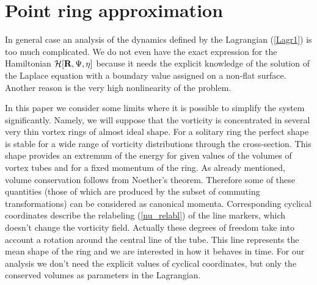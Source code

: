 \section{Point ring approximation}

In general case an analysis of the dynamics defined by the Lagrangian 
(\ref{Lagr1}) is too much complicated. We do not even have the exact expression for
the Hamiltonian ${\cal H}[{\bf R},\Psi,\eta]$ because it needs the 
explicit knowledge of the solution of the Laplace equation with a boundary value 
assigned on a non-flat surface. Another reason is the very high nonlinearity
of the problem.

In this paper we consider some limits where it 
is possible to simplify the system significantly. Namely, we will 
suppose that the vorticity is concentrated in several very thin vortex 
rings of almost ideal shape. For a solitary ring the perfect shape 
is stable for a wide range of vorticity distributions through the cross-section. 
This shape provides an extremum of the energy for given values of the volumes
of vortex tubes  and for a fixed momentum of the ring. As already 
mentioned, volume conservation follows from  Noether's theorem.
Therefore some of these quantities (those of which 
are produced by the subset of commuting transformations) 
can be considered as canonical momenta.
Corresponding cyclical coordinates describe the relabeling (\ref{nu_relabl})
of the line markers, which doesn't change the vorticity field. Actually these 
degrees of freedom take into account a rotation around the central line of the 
tube. This line represents the mean shape of the ring and we are interested in how
it behaves in time. For our analysis we don't need the explicit values 
of cyclical coordinates, but only the conserved volumes as parameters 
in the Lagrangian. 

